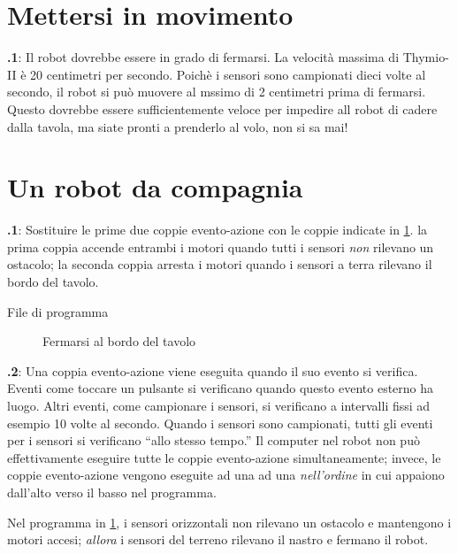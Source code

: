 \documentclass[12pt,a4paper,italian]{article}
\begin{document}
\section{Mettersi in movimento}

\textbf{\thesection.1}: Il robot dovrebbe essere in grado di fermarsi.
La velocità massima di Thymio-II è 20 centimetri per secondo. Poichè
i sensori sono campionati dieci volte al secondo, il robot si può
muovere al mssimo di 2 centimetri prima di fermarsi. Questo dovrebbe
essere sufficientemente veloce per impedire all robot di cadere dalla
tavola, ma siate pronti a prenderlo al volo, non si sa mai!

\section{Un robot da compagnia}

\textbf{\thesection.1}: Sostituire le prime due coppie evento-azione
con le coppie indicate in \cref{fig.answer1}. la prima coppia
accende entrambi i motori quando tutti i sensori \emph{non} rilevano un ostacolo;
la seconda coppia arresta i motori quando i sensori a terra rilevano il bordo
del tavolo.

{\raggedleft \hfill File di programma }

\begin{figure}[hbt]
\begin{center}
\caption{Fermarsi al bordo del tavolo}\label{fig.answer1}
\end{center}
\end{figure}

\textbf{\thesection.2}: Una coppia evento-azione viene eseguita quando il suo evento
si verifica. Eventi come toccare un pulsante si verificano quando questo evento esterno
ha luogo. Altri eventi, come campionare i sensori, si verificano a intervalli fissi
ad esempio 10 volte al secondo. Quando i sensori sono campionati, tutti gli eventi per
i sensori si verificano ``allo stesso tempo.'' Il computer nel robot non può
effettivamente eseguire tutte le coppie evento-azione simultaneamente; invece, le
coppie evento-azione vengono eseguite ad una ad una \emph{nell'ordine} in cui
appaiono dall'alto verso il basso nel programma.

Nel programma in \cref{fig.answer1}, i sensori orizzontali
non rilevano un ostacolo e mantengono i motori accesi; \emph{allora}  i
sensori del terreno rilevano il nastro e fermano il robot.
\end{document}

